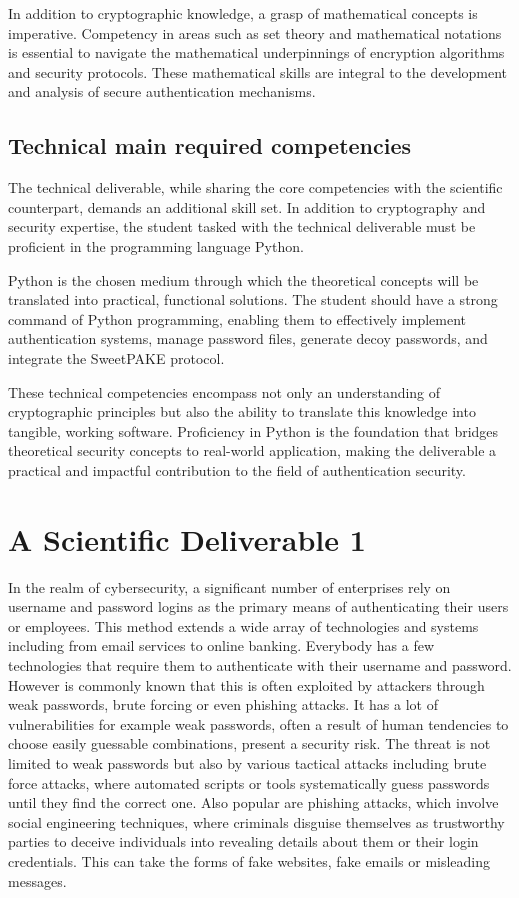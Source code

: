 \documentclass[conference,compsoc]{IEEEtran}
\begin{document}
In addition to cryptographic knowledge, a grasp of mathematical concepts is
imperative. Competency in areas such as set theory and mathematical notations
is essential to navigate the mathematical underpinnings of encryption
algorithms and security protocols. These mathematical skills are integral to
the development and analysis of secure authentication mechanisms.

\subsection{Technical main required competencies} 
The technical deliverable, while sharing the core competencies with the
scientific counterpart, demands an additional skill set. In addition to
cryptography and security expertise, the student tasked with the technical
deliverable must be proficient in the programming language Python.

Python is the chosen medium through which the theoretical concepts will be
translated into practical, functional solutions. The student should have a
strong command of Python programming, enabling them to effectively implement
authentication systems, manage password files, generate decoy passwords, and
integrate the SweetPAKE protocol.

These technical competencies encompass not only an understanding of
cryptographic principles but also the ability to translate this knowledge into
tangible, working software. Proficiency in Python is the foundation that bridges
theoretical security concepts to real-world application, making the deliverable
a practical and impactful contribution to the field of authentication security.

\section{ A Scientific Deliverable 1 } 

In the realm of cybersecurity, a significant number of enterprises rely on
username and password logins as the primary means of authenticating their users
or employees. This method extends a wide array of technologies and systems
including from email services to online banking. Everybody has a few
technologies that require them to authenticate with their username and
password. However is commonly known that this is often exploited by attackers
through weak passwords, brute forcing or even phishing attacks. It has a lot of
vulnerabilities for example weak passwords, often a result of human tendencies
to choose easily guessable combinations, present a security risk. The threat is
not limited to weak passwords but also by various tactical attacks including
brute force attacks, where automated scripts or tools systematically guess
passwords until they find the correct one. Also popular are phishing attacks,
which involve social engineering techniques, where criminals disguise
themselves as trustworthy parties to deceive individuals into revealing details
about them or their login credentials. This can take the forms of fake
websites, fake emails or misleading messages.
\end{document}
